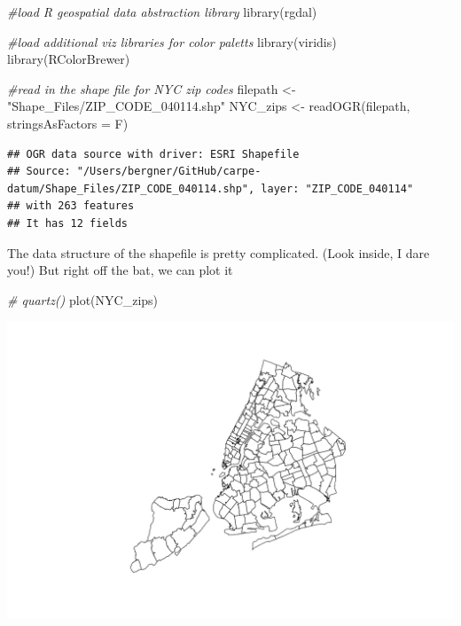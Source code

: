 \documentclass[
  openany]{book}
\newenvironment{Shaded}{\begin{snugshade}}{\end{snugshade}}
\newcommand{\AttributeTok}[1]{\textcolor[rgb]{0.77,0.63,0.00}{#1}}
\newcommand{\CommentTok}[1]{\textcolor[rgb]{0.56,0.35,0.01}{\textit{#1}}}
\newcommand{\FunctionTok}[1]{\textcolor[rgb]{0.00,0.00,0.00}{#1}}
\newcommand{\NormalTok}[1]{#1}
\newcommand{\OtherTok}[1]{\textcolor[rgb]{0.56,0.35,0.01}{#1}}
\newcommand{\StringTok}[1]{\textcolor[rgb]{0.31,0.60,0.02}{#1}}
\begin{document}
\begin{Shaded}
\begin{Highlighting}[]
\CommentTok{\#load R geospatial data abstraction library}
\FunctionTok{library}\NormalTok{(rgdal)}

\CommentTok{\#load additional viz libraries for color paletts}
\FunctionTok{library}\NormalTok{(viridis)}
\FunctionTok{library}\NormalTok{(RColorBrewer)}

\CommentTok{\#read in the shape file for NYC zip codes}
\NormalTok{filepath }\OtherTok{\textless{}{-}} \StringTok{"Shape\_Files/ZIP\_CODE\_040114.shp"}
\NormalTok{NYC\_zips }\OtherTok{\textless{}{-}} \FunctionTok{readOGR}\NormalTok{(filepath, }\AttributeTok{stringsAsFactors =}\NormalTok{ F)}
\end{Highlighting}
\end{Shaded}

\begin{verbatim}
## OGR data source with driver: ESRI Shapefile
## Source: "/Users/bergner/GitHub/carpe-datum/Shape_Files/ZIP_CODE_040114.shp", layer: "ZIP_CODE_040114"
## with 263 features
## It has 12 fields
\end{verbatim}

The data structure of the shapefile is pretty complicated. (Look inside, I dare you!)
But right off the bat, we can plot it

\begin{Shaded}
\begin{Highlighting}[]
\CommentTok{\# quartz()}
\FunctionTok{plot}\NormalTok{(NYC\_zips)}
\end{Highlighting}
\end{Shaded}

\begin{center}\includegraphics[width=0.9\linewidth]{carpedatum_files/figure-html/unnamed-chunk-81-1} \end{center}
\end{document}
